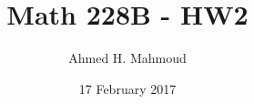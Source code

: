 \documentclass[12pt]{article}
\begin{document}
\title{Math 228B - HW2}
\author{Ahmed H. Mahmoud}
\date{17 February 2017} 

\maketitle

\newcommand{\cn}{Crank-Nicolson}



\newpage



\newpage




\end{document}
